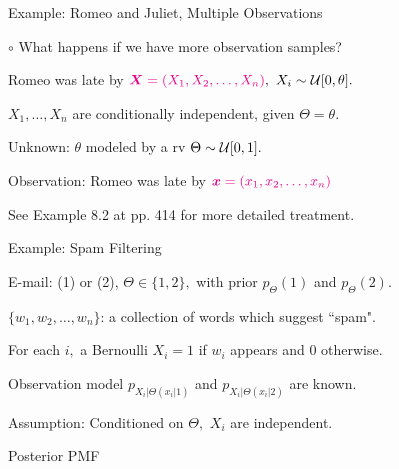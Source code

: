 \begin{frame}{Example: Romeo and Juliet, Multiple Observations}

{\large $\circ$ What happens if we have more observation samples?}
  
  

\plitemsep 0.1in
\bci
\item Romeo was late  by ${\color{magenta} \bm{X}=(X_1,X_2, \ldots, X_n)}, \ X_i \sim \mathcal U[0,\theta].$
\item $X_1,\ldots, X_n$ are conditionally independent, given $\Theta = \theta.$
\item Unknown: $\theta$ modeled by a rv $\Theta \sim \mathcal U[0,1].$
\item Observation: Romeo was late  by ${\color{magenta} \bm{x} = (x_1, x_2, \ldots, x_n)}$
\item See Example 8.2 at pp. 414 for more detailed treatment.   

  \eci

\end{frame}

\begin{frame}{Example: Spam Filtering}

\plitemsep 0.05in
\bci
\item<1-> E-mail:  (1) or  (2), $\Theta  \in \{1,2\},$ with prior $p_{\Theta}(1)$ and  $p_{\Theta}(2).$

\item<2-> $\{w_1, w_2, \ldots, w_n \}$: a collection of words which suggest ``spam".

\item<3-> For each $i,$ a Bernoulli $X_i=1$ if $w_i$ appears and 0 otherwise.

\item<4-> Observation model $p_{X_i|\Theta(x_i|1)}$ and
  $p_{X_i|\Theta(x_i|2)}$ are known.

\item<4-> Assumption: Conditioned on $\Theta,$ $X_i$ are independent.
\item<5-> Posterior PMF
\eci

\end{frame}



